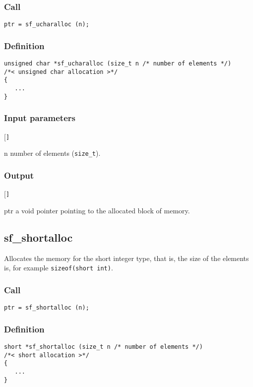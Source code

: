 \subsubsection*{Call}
\begin{verbatim}ptr = sf_ucharalloc (n);\end{verbatim}

\subsubsection*{Definition}
\begin{verbatim}
unsigned char *sf_ucharalloc (size_t n /* number of elements */)
/*< unsigned char allocation >*/ 
{
   ...
}
\end{verbatim}

\subsubsection*{Input parameters}
\begin{desclist}{\tt }{\quad}[\tt ]
   \setlength\itemsep{0pt}
   \item[n]	number of elements (\texttt{size\_t}).
\end{desclist}

\subsubsection*{Output}
\begin{desclist}{\tt }{\quad}[\tt ]
   \setlength\itemsep{0pt}
   \item[ptr] a void pointer pointing to the allocated block of memory.
\end{desclist}




\subsection{{sf\_shortalloc}}
Allocates the memory for  the short integer type, that is,  the size of the elements is, for example \texttt{sizeof(short int)}. 

\subsubsection*{Call}
\begin{verbatim}ptr = sf_shortalloc (n);\end{verbatim}

\subsubsection*{Definition}
\begin{verbatim}
short *sf_shortalloc (size_t n /* number of elements */)
/*< short allocation >*/  
{
   ...
}
\end{verbatim}

